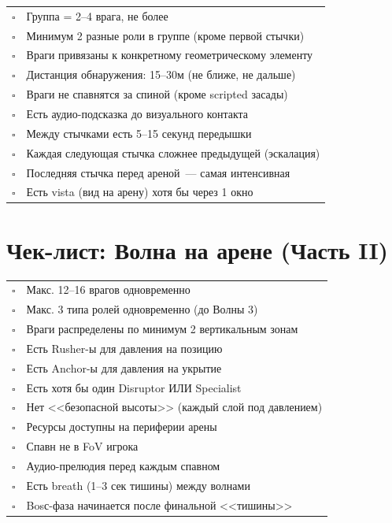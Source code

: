 \documentclass[a4paper,11pt]{report}
\begin{document}
\begin{table}[H]
\centering
\begin{tabularx}{\textwidth}{@{}cX@{}}
\toprule
$\square$ & Группа = 2--4 врага, не более \\
$\square$ & Минимум 2 разные роли в группе (кроме первой стычки) \\
$\square$ & Враги привязаны к конкретному геометрическому элементу \\
$\square$ & Дистанция обнаружения: 15--30м (не ближе, не дальше) \\
$\square$ & Враги не спавнятся за спиной (кроме scripted засады) \\
$\square$ & Есть аудио-подсказка до визуального контакта \\
$\square$ & Между стычками есть 5--15 секунд передышки \\
$\square$ & Каждая следующая стычка сложнее предыдущей (эскалация) \\
$\square$ & Последняя стычка перед ареной~--- самая интенсивная \\
$\square$ & Есть vista (вид на арену) хотя бы через 1 окно \\
\bottomrule
\end{tabularx}
\end{table}

\section{Чек-лист: Волна на арене (Часть II)}

\begin{table}[H]
\centering
\begin{tabularx}{\textwidth}{@{}cX@{}}
\toprule
$\square$ & Макс. 12--16 врагов одновременно \\
$\square$ & Макс. 3 типа ролей одновременно (до Волны 3) \\
$\square$ & Враги распределены по минимум 2 вертикальным зонам \\
$\square$ & Есть Rusher-ы для давления на позицию \\
$\square$ & Есть Anchor-ы для давления на укрытие \\
$\square$ & Есть хотя бы один Disruptor ИЛИ Specialist \\
$\square$ & Нет <<безопасной высоты>> (каждый слой под давлением) \\
$\square$ & Ресурсы доступны на периферии арены \\
$\square$ & Спавн не в FoV игрока \\
$\square$ & Аудио-прелюдия перед каждым спавном \\
$\square$ & Есть breath (1--3 сек тишины) между волнами \\
$\square$ & Bosс-фаза начинается после финальной <<тишины>> \\
\bottomrule
\end{tabularx}
\end{table}
\end{document}
